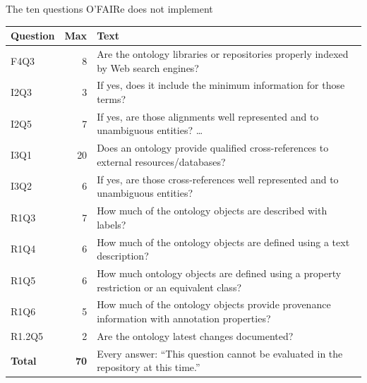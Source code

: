 \documentclass[aspectratio=169,10pt]{beamer}
\begin{document}
\begin{frame}{The ten questions O'FAIRe does not implement}
  \scriptsize
  \begin{tabularx}{\textwidth}{@{}l r X@{}}
    \toprule
    Question & Max & Text\\
    \midrule
    F4Q3 & 8 & Are the ontology libraries or repositories properly indexed by Web search engines?\\
    I2Q3 & 3 & If yes, does it include the minimum information for those terms?\\
    I2Q5 & 7 & If yes, are those alignments well represented and to unambiguous entities? \dots\\
    I3Q1 & 20 & Does an ontology provide qualified cross-references to external resources/databases?\\
    I3Q2 & 6 & If yes, are those cross-references well represented and to unambiguous entities?\\
    R1Q3 & 7 & How much of the ontology objects are described with labels?\\
    R1Q4 & 6 & How much of the ontology objects are defined using a text description?\\
    R1Q5 & 6 & How much ontology objects are defined using a property restriction or an equivalent class?\\
    R1Q6 & 5 & How much of the ontology objects provide provenance information with annotation properties?\\
    R1.2Q5 & 2 & Are the ontology latest changes documented?\\
    \midrule
    \textbf{Total} & \textbf{70} & Every answer: ``This question cannot be evaluated in the repository at this time.''\\
    \bottomrule
  \end{tabularx}
\end{frame}
\end{document}

